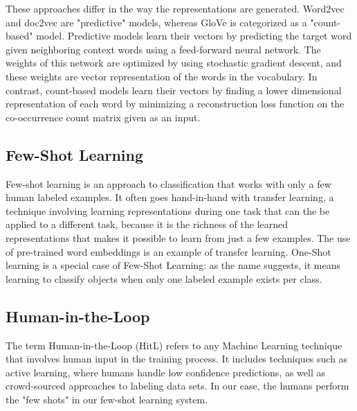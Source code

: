 \documentclass{article} %
\begin{document}
These approaches differ in the way the representations are generated.  Word2vec and doc2vec are "predictive" models, whereas GloVe is categorized as a "count-based" model.  Predictive models learn their vectors by predicting the target word given neighboring context words using a feed-forward neural network. The weights of this network are optimized by using stochastic gradient descent, and these weights are vector representation of the words in the vocabulary. In contrast, count-based models learn their vectors by finding a lower dimensional representation of each word by minimizing a reconstruction loss function on the co-occurrence count matrix given as an input.

\subsection*{Few-Shot Learning}
Few-shot learning is an approach to classification that works with only a few human labeled examples. It often goes hand-in-hand with transfer learning, a technique involving learning representations during one task that can the be applied to a different task, because it is the richness of the learned representations that makes it possible to learn from just a few examples. The use of pre-trained word embeddings is an example of transfer learning. One-Shot learning is a special case of Few-Shot Learning: as the name suggests, it means learning to classify objects when only one labeled example exists per class.

\subsection*{Human-in-the-Loop}
The term Human-in-the-Loop (HitL) refers to any Machine Learning technique that involves human input in the training process. It includes techniques such as active learning, where humans handle low confidence predictions, as well as crowd-sourced approaches to labeling data sets. In our case, the humans perform the "few shots" in our few-shot learning system.
\end{document}
